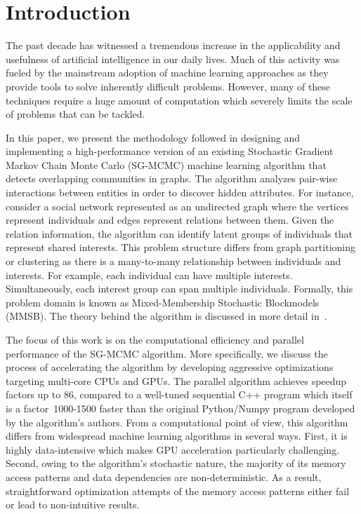 \section{Introduction}

The past decade has witnessed a tremendous increase in the applicability and
usefulness of artificial intelligence in our daily lives. Much of this activity
was fueled by the mainstream adoption of machine learning approaches as they
provide tools to solve inherently difficult problems.
%
However, many of these techniques require a huge amount of computation
which severely limits the
scale of problems that can be tackled.

In this paper, we present the methodology followed in designing and
implementing a high-performance version of an existing Stochastic Gradient Markov Chain
Monte Carlo (SG-MCMC) machine learning algorithm that detects overlapping
communities in graphs. The algorithm analyzes pair-wise interactions between
entities in order to discover hidden attributes.
%
For instance, consider a social network represented as an undirected graph
where the vertices represent individuals and edges represent relations between
them. Given the relation information, the algorithm can identify latent groups
of individuals that represent shared interests.
%
This problem structure differs from graph partitioning or clustering as there
is a many-to-many relationship between individuals and interests. For example,
each individual can have multiple interests. Simultaneously, each interest group can
span multiple individuals.
%
Formally, this problem domain is known as Mixed-Membership Stochastic
Blockmodels (MMSB). The theory behind the algorithm is discussed in more detail
in~\cite{LiAW15}.

The focus of this work is on the computational efficiency and parallel
performance of the SG-MCMC algorithm. More specifically, we discuss the process
of accelerating the algorithm by developing aggressive optimizations targeting
multi-core CPUs and GPUs. The parallel algorithm achieves speedup factors up to 86, compared to a
well-tuned sequential C++ program which itself is a factor~1000-1500 faster than
the original Python/Numpy program developed by the algorithm's authors. From a
computational point of view, this algorithm differs from widespread machine
learning algorithms in several ways. First, it is highly data-intensive which
makes GPU acceleration particularly challenging. Second, owing
to the algorithm's stochastic nature, the majority of its memory access
patterns and data dependencies are non-deterministic. As a result,
straightforward
optimization attempts of the memory access patterns either fail or lead
to non-intuitive results.

